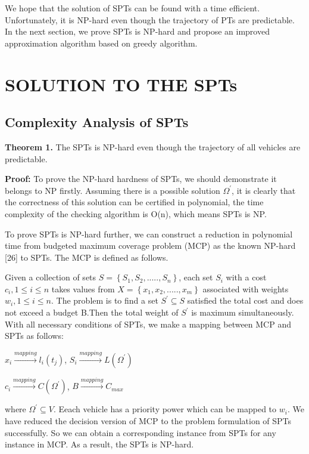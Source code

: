 \documentclass[journal]{IEEEtran}
\begin{document}
We hope that the solution of SPTs can be found with a time efficient. Unfortunately, it is NP-hard even though the trajectory of PTs are predictable. In the next section, we prove SPTs is NP-hard and propose an improved approximation algorithm based on greedy algorithm.
\section{SOLUTION TO THE SPTs}
\subsection{Complexity Analysis of SPTs}
\noindent
\textbf{Theorem 1.} The SPTs is NP-hard even though the trajectory of all vehicles are predictable.

\noindent
\textbf{Proof:} To prove the NP-hard hardness of SPTs, we should demonstrate it belongs to NP firstly. Assuming there is a possible solution $\Omega ^{'}$, it is clearly that the correctness of this solution can be certified in polynomial, the time complexity of the checking algorithm is O(n), which means SPTs is NP.

To prove SPTs is NP-hard further, we can construct a reduction in polynomial time from budgeted maximum coverage problem (MCP) as the known NP-hard [26] to SPTs. The MCP is defined as follows. 

Given a collection of sets $S=\left \{ S_{1},S_{2},.....,S_{n} \right \}$, each set $S_{i}$ with a cost  $c_{i},1\leqslant i\leqslant n$ takes values from $X=\left \{ x_{1},x_{2},.....,x_{m} \right \} $ associated with weights $w_{i},1\leqslant i\leqslant n$. The problem is to find a set $S^{'}\subseteq S$ satisfied the total cost and does not exceed a budget B.Then the total weight of $S^{'}$ is maximum simultaneously.
With all necessary conditions of SPTs, we make a mapping between MCP and SPTs as follows:
\begin{center}
$x_{i}\overset{mapping}{\rightarrow}l_{i}(t_{j})$,
$S_{i}\overset{mapping}{\rightarrow}L({\Omega ^{'}})$	
\end{center}
\begin{center}
$c_{i}\overset{mapping}{\rightarrow}C({\Omega ^{'}})$,
$B\overset{mapping}{\rightarrow}C_{max}$
\end{center}
where $\Omega ^{'}\subseteq V$. Eeach vehicle has a priority power which can be mapped to  $w_{i}$. We have reduced the decision version of MCP to the problem formulation of SPTs successfully. So we can obtain a corresponding instance from SPTs for any instance in MCP. As a result, the SPTs is NP-hard.
\end{document}
